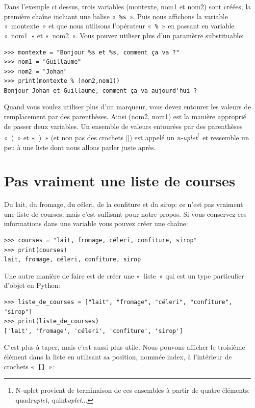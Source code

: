 Dans l'exemple ci dessus, trois variables (montexte, nom1 et nom2) sont créées, la première chaîne incluant une balise «~\texttt{\%s}~». Puis nous affichons la variable «~montexte~» et que nous utilisons l'opérateur «~\texttt{\%}~»  en passant en variable «~nom1~» et «~nom2~». Vous pouvez utiliser plus d'un paramètre substituable:

\begin{Verbatim}[frame=single,rulecolor=\color{mbleu}, label=à taper]
>>> montexte = "Bonjour %s et %s, comment ça va ?"
>>> nom1 = "Guillaume"
>>> nom2 = "Johan"
>>> print(montexte % (nom2,nom1))
Bonjour Johan et Guillaume, comment ça va aujourd'hui ?
\end{Verbatim}

Quand vous voulez utiliser plus d'un marqueur, vous devez entourer les valeurs de remplacement par des parenthèses. Ainsi (nom2, nom1) est la manière approprié de passer deux variables. Un ensemble de valeurs entourées par des parenthèses «~(~» et «~)~» (et non pas des crochets []) est appelé un \emph{n-uplet}\footnote{N-uplet provient de terminaison de ces ensembles à partir de quatre éléments: quadr\emph{uplet}, quint\emph{uplet}...} et ressemble un peu à une liste dont nous allons parler juste après.

\section{Pas vraiment une liste de courses}
Du lait, du fromage, du céleri, de la confiture et du sirop: ce n'est pas vraiment une liste de courses, mais c'est suffisant pour notre propos. Si vous conservez ces informations dans une variable vous pouvez créer une chaîne:

\begin{Verbatim}[frame=single,rulecolor=\color{mbleu}, label=à taper]
>>> courses = "lait, fromage, céleri, confiture, sirop"
>>> print(courses)
lait, fromage, céleri, confiture, sirop
\end{Verbatim}

Une autre manière de faire est de créer une «~liste~» qui est un type particulier d'objet en Python:
\begin{small}
\begin{Verbatim}[frame=single,rulecolor=\color{mbleu}, label=à taper]
>>> liste_de_courses = ["lait", "fromage", "céleri", "confiture", "sirop"]
>>> print(liste_de_courses)
['lait', 'fromage', 'céleri', 'confiture', 'sirop']
\end{Verbatim}
\end{small}
C'est plus à taper, mais c'est aussi plus utile. 
Nous pouvons afficher le troisième élément dans la liste en utilisant sa position, nommée index, à l'intérieur de crochets «~\texttt{[]}~»:

